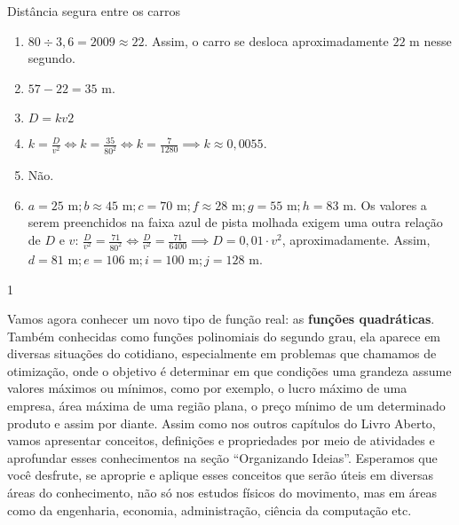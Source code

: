\begin{answer}{Distância segura entre os carros}
{
\begin{enumerate}
\item $80\div3{,}6=2009\approx22$. Assim, o carro se desloca aproximadamente $22$ m nesse segundo.
\item $57−22=35$ m.
\item $D=kv2$
\item $k=\frac{D}{v^2}\iff k=\frac{35}{80^2}\iff k=\frac{7}{1280}\implies k\approx0{,}0055$.
\item Não.
\item $a=25\text{ m}; b\approx45 \text{ m}; c=70 \text{ m}; f\approx28 \text{ m}; g=55 \text{ m}; h=83 \text{ m}.$ Os valores a serem preenchidos na faixa azul de pista molhada exigem uma outra relação de $D$ e $v$: $\frac{D}{v^2}=\frac{71}{80^2}\iff\frac{D}{v^2}=\frac{71}{6400}\implies D=0{,}01\cdot v^2$, aproximadamente. Assim, $d=81 \text{ m}; e=106 \text{ m}; i=100 \text{ m}; j=128 \text{ m}$.
\end{enumerate}
}{1}
\end{answer}

\label{\detokenize{AF209-0:sec-funcao-quadratica-movimento-com-velocidade-variavel-queda-vertical}}\label{\detokenize{AF209-0::doc}}\label{\detokenize{AF209-0:explorando-movimentos-com-velocidade-variavel}}\label{\detokenize{AF209-0:ativ-funcao-quadratica-lancamento-vertical-em-dubai}}

Vamos agora conhecer um {}novo tipo de função real: as \textbf{funções quadráticas}. Também conhecidas como funções polinomiais do segundo grau, ela aparece em diversas situações do cotidiano, especialmente em problemas que chamamos de otimização, onde o objetivo é determinar em que condições uma grandeza assume valores máximos ou mínimos, como por exemplo, o lucro máximo de uma empresa, área máxima de uma região plana, o preço mínimo de um determinado produto e assim por diante. Assim como nos outros capítulos do Livro Aberto, vamos apresentar conceitos, definições e propriedades por meio de atividades e aprofundar esses conhecimentos na seção “Organizando Ideias”. Esperamos que você desfrute, se aproprie e aplique esses conceitos que serão úteis em diversas áreas do conhecimento, não só nos estudos físicos do movimento, mas em áreas como da engenharia, economia, administração, ciência da computação etc.

